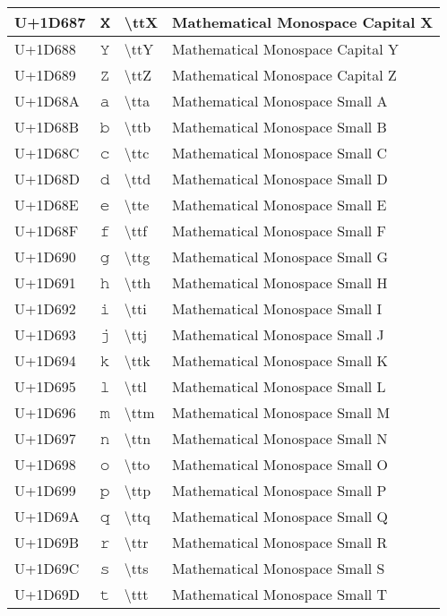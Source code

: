 \begin{table}[h]
\begin{tabulary}{\linewidth}{|L|L|L|L|}
\hline
U+1D687 & 𝚇 & {\textbackslash}ttX & Mathematical Monospace Capital X \\
\hline
U+1D688 & 𝚈 & {\textbackslash}ttY & Mathematical Monospace Capital Y \\
\hline
U+1D689 & 𝚉 & {\textbackslash}ttZ & Mathematical Monospace Capital Z \\
\hline
U+1D68A & 𝚊 & {\textbackslash}tta & Mathematical Monospace Small A \\
\hline
U+1D68B & 𝚋 & {\textbackslash}ttb & Mathematical Monospace Small B \\
\hline
U+1D68C & 𝚌 & {\textbackslash}ttc & Mathematical Monospace Small C \\
\hline
U+1D68D & 𝚍 & {\textbackslash}ttd & Mathematical Monospace Small D \\
\hline
U+1D68E & 𝚎 & {\textbackslash}tte & Mathematical Monospace Small E \\
\hline
U+1D68F & 𝚏 & {\textbackslash}ttf & Mathematical Monospace Small F \\
\hline
U+1D690 & 𝚐 & {\textbackslash}ttg & Mathematical Monospace Small G \\
\hline
U+1D691 & 𝚑 & {\textbackslash}tth & Mathematical Monospace Small H \\
\hline
U+1D692 & 𝚒 & {\textbackslash}tti & Mathematical Monospace Small I \\
\hline
U+1D693 & 𝚓 & {\textbackslash}ttj & Mathematical Monospace Small J \\
\hline
U+1D694 & 𝚔 & {\textbackslash}ttk & Mathematical Monospace Small K \\
\hline
U+1D695 & 𝚕 & {\textbackslash}ttl & Mathematical Monospace Small L \\
\hline
U+1D696 & 𝚖 & {\textbackslash}ttm & Mathematical Monospace Small M \\
\hline
U+1D697 & 𝚗 & {\textbackslash}ttn & Mathematical Monospace Small N \\
\hline
U+1D698 & 𝚘 & {\textbackslash}tto & Mathematical Monospace Small O \\
\hline
U+1D699 & 𝚙 & {\textbackslash}ttp & Mathematical Monospace Small P \\
\hline
U+1D69A & 𝚚 & {\textbackslash}ttq & Mathematical Monospace Small Q \\
\hline
U+1D69B & 𝚛 & {\textbackslash}ttr & Mathematical Monospace Small R \\
\hline
U+1D69C & 𝚜 & {\textbackslash}tts & Mathematical Monospace Small S \\
\hline
U+1D69D & 𝚝 & {\textbackslash}ttt & Mathematical Monospace Small T \\

\end{tabulary}
\end{table}
